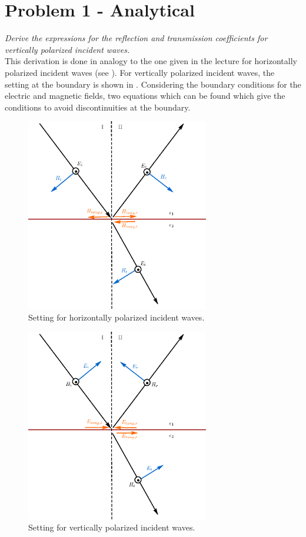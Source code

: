 \section{Problem 1 - Analytical}
\textit{Derive the expressions for the reflection and transmission coefficients for vertically polarized incident waves.}\\

This derivation is done in analogy to the one given in the lecture for horizontally polarized incident waves (see ). For vertically polarized incident waves, the setting at the boundary is shown in . Considering the boundary conditions for the electric and magnetic fields, two equations which can be found which give the conditions to avoid discontinuities at the boundary. 

 \begin{figure} [!h]
 \centering
 \includegraphics[width=8cm]{figures/mm12_1_H.eps}
 \caption{Setting for horizontally polarized incident waves.} \label{fig:mm12_1_H}
 \end{figure}

 \begin{figure} [!h]
 \centering
 \includegraphics[width=8cm]{figures/mm12_1_V.eps}
 \caption{Setting for vertically polarized incident waves.} \label{fig:mm12_1_V}
 \end{figure}

